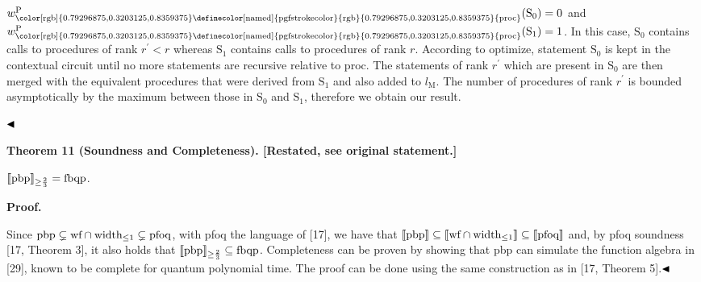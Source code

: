 $w_{\text{\color[rgb]{0.79296875,0.3203125,0.8359375}\definecolor[named]{%
pgfstrokecolor}{rgb}{0.79296875,0.3203125,0.8359375}{{proc}}}}^{\mathrm{P}}(%
\mathrm{S}_{0})=0$ and $w_{\text{\color[rgb]{0.79296875,0.3203125,0.8359375}\definecolor[named]{%
pgfstrokecolor}{rgb}{0.79296875,0.3203125,0.8359375}{{proc}}}}^{\mathrm{P}}(%
\mathrm{S}_{1})=1$. In this case, $\mathrm{S}_{0}$ contains calls to procedures of rank $r^{\prime}<r$ whereas $\mathrm{S}_{1}$ contains calls to procedures of rank $r$. According to optimize, statement $\mathrm{S}_{0}$ is kept in the contextual circuit until no more statements are recursive relative to proc. The statements of rank $r^{\prime}$ which are present in $\mathrm{S}_{0}$ are then merged with the equivalent procedures that were derived from $\mathrm{S}_{1}$ and also added to $l_{\text{M}}$. The number of procedures of rank $r^{\prime}$ is bounded asymptotically by the maximum between those in $\mathrm{S}_{0}$ and $\mathrm{S}_{1}$, therefore we obtain our result.\par
 
 
  
$\hfill\blacktriangleleft$\par
 
 
 
 
\par\medskip\noindent\textbf{Theorem 11 (Soundness and Completeness). [Restated, see original statement.]}\par
 
 
$\llbracket\textnormal{{pbp}}{}\rrbracket_{\geq\frac{2}{3}}=\textnormal{{fbqp}}{}$.\par
 
 
 
 
 
 
\par\medskip\noindent\textbf{Proof.}\par
 
 
Since $\textnormal{{pbp}}\subsetneq\textnormal{{wf}}\cap\textnormal{{width}}_{\leq 1}%
\subsetneq\textnormal{{pfoq}}{}$, with pfoq the language of [17], we have that $\llbracket\textnormal{{pbp}}{}\rrbracket\subseteq\llbracket\textnormal{{wf}}%
\cap\textnormal{{width}}_{\leq 1}\rrbracket\subseteq\llbracket\textnormal{{%
pfoq}}{}\rrbracket$ and, by pfoq soundness [17, Theorem 3], it also holds that $\llbracket\textnormal{{pbp}}{}\rrbracket_{\geq\frac{2}{3}}\subseteq\textnormal%
{{fbqp}}{}$. Completeness can be proven by showing that pbp can simulate the function algebra in [29], known to be complete for quantum polynomial time. The proof can be done using the same construction as in [17, Theorem 5].$\hfill\blacktriangleleft$\par
 

